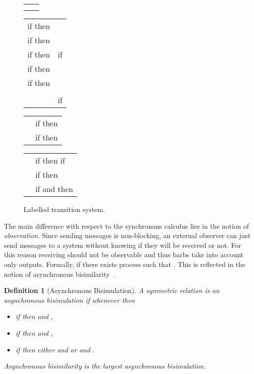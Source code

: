 \documentclass[copyright,creativecommons]{eptcs}
\newcommand{\<}{\langle}
\renewcommand{\>}{\rangle}
\newtheorem{definition}{Definition}{}
\begin{document}
\begin{figure}[!t]
\center
\begin{tabular}{p{7.3 cm} p{5 cm}}
\hline \\
   &  \bigskip\\
\hline
\end{tabular}
\caption{(Extended) Syntax of Asynchronous CCS.} \label{syntaxA}
\vspace{3mm}
\begin{tabular}{p{6 cm} p{6 cm}}
\hline
if  then  & \\
if  then  & \\
if  then  &  \hspace{3mm} if \\
if  then  &  \\
if  then  & \\
 &  \\
 &   \hspace{.75mm}if \\
\hline
\end{tabular}
\caption{Structural congruence.}
\label{congA}
\vspace{3mm}
\begin{tabular}{p{6 cm} p{6 cm}}
\hline
 & if   then  \\
 & if    then   \\
\hline
\end{tabular}
\caption{Reduction relation on pure processes.}
\label{reductionA}
\vspace{3mm}
\begin{tabular}{p{3 cm} p{9 cm}}
\hline
 & if   then   \hspace{3mm} if \\
 & if    then   \\
 & if   and  then   \\
\hline
\end{tabular}
\caption{Labelled transition system.} \label{LTSAs}
\end{figure}

The main difference with respect to the synchronous calculus lies in the notion
of \emph{observation}. Since sending messages is non-blocking, an
external observer can just send messages to a system without knowing
if they will be received or not. For this reason receiving should
not be observable and thus barbs take into account only outputs.
Formally,  if there exists process  such
that . This is reflected in the notion of
asynchronous bisimilarity~\cite{AmadioCS98}.

\begin{definition}[Asynchronous Bisimulation]\label{def:Abis}
A symmetric relation  is an \emph{asynchronous
bisimulation} if whenever  then

\begin{itemize}
\item if  then  and ,
\item if  then  and ,
\item if  then either  and  or  and .
\end{itemize}
\emph{Asynchronous bisimilarity}  is the largest
asynchronous bisimulation.
\end{definition}
\end{document}

